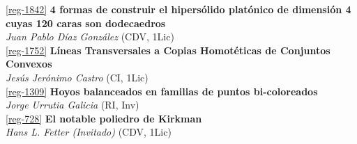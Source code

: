 \begin{multicols}{2}
\noindent  \ref{reg-1842}  {\bfseries 4 formas de construir el hipers\'olido plat\'onico de dimensi\'on 4 cuyas 120 caras son dodecaedros}\\
{\slshape  Juan Pablo D\'iaz Gonz\'alez} {\footnotesize (CDV, 1Lic)}\\

\noindent  \ref{reg-1752}  {\bfseries L\'ineas Transversales a Copias Homot\'eticas de Conjuntos Convexos}\\
{\slshape  Jes\'us  Jer\'onimo Castro} {\footnotesize (CI, 1Lic)}\\

\noindent  \ref{reg-1309}  {\bfseries Hoyos balanceados en familias de puntos bi-coloreados}\\
{\slshape  Jorge  Urrutia Galicia} {\footnotesize (RI, Inv)}\\

\noindent  \ref{reg-728}  {\bfseries El notable poliedro de Kirkman}\\
{\slshape  Hans L. Fetter (Invitado)} {\footnotesize (CDV, 1Lic)}\\

\end{multicols}
